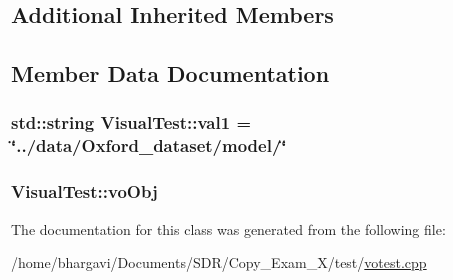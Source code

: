 \subsection*{Additional Inherited Members}


\subsection{Member Data Documentation}
\subsubsection[{\texorpdfstring{val1}{val1}}]{\setlength{\rightskip}{0pt plus 5cm}std\+::string Visual\+Test\+::val1 = \char`\"{}../data/Oxford\+\_\+dataset/model/\char`\"{}\hspace{0.3cm}{\ttfamily [protected]}}\hypertarget{class_visual_test_add48da25b6995fd1442424f779a777d1}{}\label{class_visual_test_add48da25b6995fd1442424f779a777d1}
\subsubsection[{\texorpdfstring{vo\+Obj}{voObj}}]{ Visual\+Test\+::vo\+Obj\hspace{0.3cm}{\ttfamily [protected]}}\hypertarget{class_visual_test_ada2ac3c1ec41626761106d66c768ee19}{}\label{class_visual_test_ada2ac3c1ec41626761106d66c768ee19}


The documentation for this class was generated from the following file\+:\begin{DoxyCompactItemize}
\item 
/home/bhargavi/\+Documents/\+S\+D\+R/\+Copy\+\_\+\+Exam\+\_\+X/test/\hyperlink{votest_8cpp}{votest.\+cpp}\end{DoxyCompactItemize}
